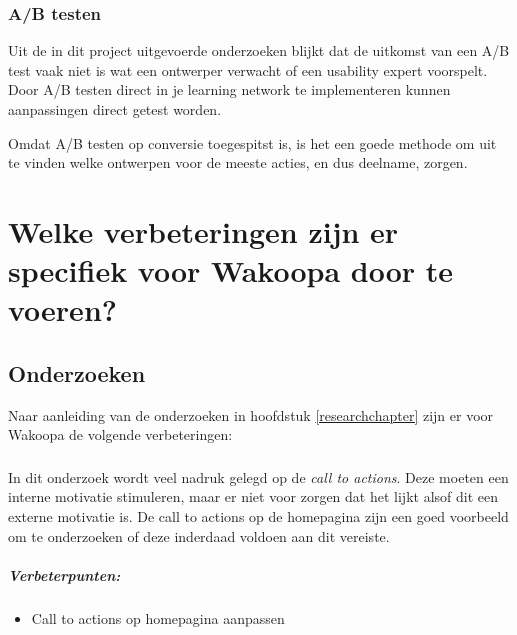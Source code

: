 \documentclass[a4paper, 10pt, pdftex]{report}
\begin{document}
    \subsection{A/B testen}
      Uit de in dit project uitgevoerde onderzoeken blijkt dat de uitkomst van een A/B test vaak niet is wat een ontwerper verwacht of een usability expert voorspelt. Door A/B testen direct in je learning network te implementeren kunnen aanpassingen direct getest worden.

      Omdat A/B testen op conversie toegespitst is, is het een goede methode om uit te vinden welke ontwerpen voor de meeste acties, en dus deelname, zorgen.

  \newpage
  \chapter{Welke verbeteringen zijn er specifiek voor Wakoopa door te voeren?}
    \newpage

    \section{Onderzoeken}
    Naar aanleiding van de onderzoeken in hoofdstuk \ref{researchchapter} zijn er voor Wakoopa de volgende verbeteringen:

 \subsection{\cite{Beenen2004}}
      In dit onderzoek wordt veel nadruk gelegd op de \emph{call to actions}. Deze moeten een interne motivatie stimuleren, maar er niet voor zorgen dat het lijkt alsof dit een externe motivatie is. De call to actions op de homepagina zijn een goed voorbeeld om te onderzoeken of deze inderdaad voldoen aan dit vereiste.

      \paragraph{\textbf{Verbeterpunten:}}
      \begin{itemize}
        \item Call to actions op homepagina aanpassen
      \end{itemize}
\end{document}
